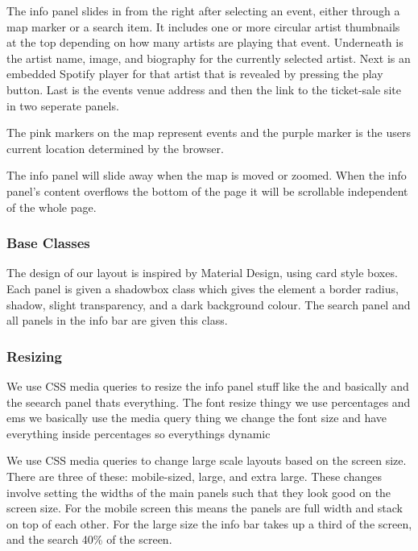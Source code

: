 \documentclass[10pt]{article}
\begin{document}
                The info panel slides in from the right after selecting an event, either through a map marker or a search item. It includes one or more circular artist thumbnails at the top depending on how many artists are playing that event. Underneath is the artist name, image, and biography for the currently selected artist. Next is an embedded Spotify player for that artist that is revealed by pressing the play button. Last is the events venue address and then the link to the ticket-sale site in two seperate panels.

                The pink markers on the map represent events and the purple marker is the users current location determined by the browser.

                The info panel will slide away when the map is moved or zoomed. When the info panel's content overflows the bottom of the page it will be scrollable independent of the whole page.


            \subsubsection{Base Classes}
                The design of our layout is inspired by Material Design, using card style boxes. Each panel is given a shadowbox class which gives the element a border radius, shadow, slight transparency, and a dark background colour. The search panel and all panels in the info bar are given this class.

            \subsubsection{Resizing}
                We use CSS media queries to resize the info panel stuff like the and basically and the seearch panel thats everything. The font resize thingy we use percentages and ems we basically use the media query thing we change the font size and have everything inside percentages so everythings dynamic

                We use CSS media queries to change large scale layouts based on the screen size. There are three of these: mobile-sized, large, and extra large. These changes involve setting the widths of the main panels such that they look good on the screen size. For the mobile screen this means the panels are full width and stack on top of each other. For the large size the info bar takes up a third of the screen, and the search 40\% of the screen.
\end{document}
